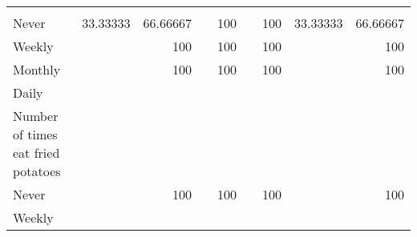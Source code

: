 \documentclass{article}
\begin{document}
\begin{tabular}{lllllllll}
  \multicolumn{1}{|r}{} &
  \multicolumn{1}{r}{} &
  \multicolumn{1}{r}{} &
  \multicolumn{1}{r}{} &
  \multicolumn{1}{r}{} &
  \multicolumn{1}{r}{} &
  \multicolumn{1}{r}{} &
  \multicolumn{1}{r}{} \\
\multicolumn{1}{l}{\hspace{7em}Never} &
  \multicolumn{1}{|r}{33.33333} &
  \multicolumn{1}{r}{66.66667} &
  \multicolumn{1}{r}{} &
  \multicolumn{1}{r}{100} &
  \multicolumn{1}{r}{} &
  \multicolumn{1}{r}{100} &
  \multicolumn{1}{r}{33.33333} &
  \multicolumn{1}{r}{66.66667} \\
\multicolumn{1}{l}{\hspace{7em}Weekly} &
  \multicolumn{1}{|r}{} &
  \multicolumn{1}{r}{100} &
  \multicolumn{1}{r}{} &
  \multicolumn{1}{r}{100} &
  \multicolumn{1}{r}{} &
  \multicolumn{1}{r}{100} &
  \multicolumn{1}{r}{} &
  \multicolumn{1}{r}{100} \\
\multicolumn{1}{l}{\hspace{7em}Monthly} &
  \multicolumn{1}{|r}{} &
  \multicolumn{1}{r}{100} &
  \multicolumn{1}{r}{} &
  \multicolumn{1}{r}{100} &
  \multicolumn{1}{r}{} &
  \multicolumn{1}{r}{100} &
  \multicolumn{1}{r}{} &
  \multicolumn{1}{r}{100} \\
\multicolumn{1}{l}{\hspace{5em}Daily} &
  \multicolumn{1}{|r}{} &
  \multicolumn{1}{r}{} &
  \multicolumn{1}{r}{} &
  \multicolumn{1}{r}{} &
  \multicolumn{1}{r}{} &
  \multicolumn{1}{r}{} &
  \multicolumn{1}{r}{} &
  \multicolumn{1}{r}{} \\
\multicolumn{1}{l}{\hspace{6em}Number of times eat fried potatoes} &
  \multicolumn{1}{|r}{} &
  \multicolumn{1}{r}{} &
  \multicolumn{1}{r}{} &
  \multicolumn{1}{r}{} &
  \multicolumn{1}{r}{} &
  \multicolumn{1}{r}{} &
  \multicolumn{1}{r}{} &
  \multicolumn{1}{r}{} \\
\multicolumn{1}{l}{\hspace{7em}Never} &
  \multicolumn{1}{|r}{} &
  \multicolumn{1}{r}{100} &
  \multicolumn{1}{r}{} &
  \multicolumn{1}{r}{100} &
  \multicolumn{1}{r}{} &
  \multicolumn{1}{r}{100} &
  \multicolumn{1}{r}{} &
  \multicolumn{1}{r}{100} \\
\multicolumn{1}{l}{\hspace{5em}Weekly} &
  \multicolumn{1}{|r}{} &
  \multicolumn{1}{r}{} &
  \multicolumn{1}{r}{} &
  \multicolumn{1}{r}{} &
  \multicolumn{1}{r}{} &
  \multicolumn{1}{r}{} &
  \multicolumn{1}{r}{} &
  \multicolumn{1}{r}{} \\

\end{tabular}
\end{document}

